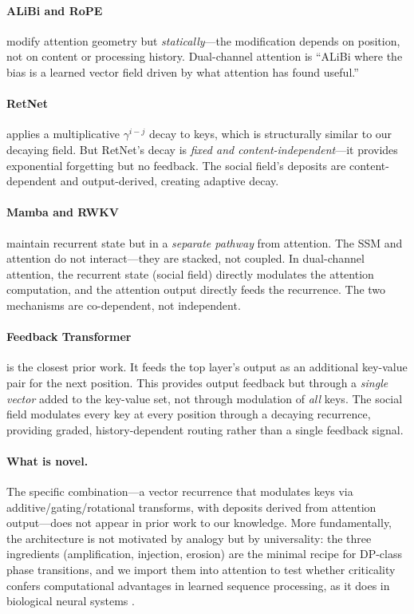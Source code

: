 \documentclass[11pt,a4paper]{article}
\begin{document}
\paragraph{ALiBi and RoPE} modify attention geometry but
\emph{statically}---the modification depends on position, not on
content or processing history.  Dual-channel attention is ``ALiBi
where the bias is a learned vector field driven by what attention
has found useful.''

\paragraph{RetNet} applies a multiplicative $\gamma^{i-j}$ decay to
keys, which is structurally similar to our decaying field.  But
RetNet's decay is \emph{fixed and content-independent}---it provides
exponential forgetting but no feedback.  The social field's deposits
are content-dependent and output-derived, creating adaptive decay.

\paragraph{Mamba and RWKV} maintain recurrent state but in a
\emph{separate pathway} from attention.  The SSM and attention do not
interact---they are stacked, not coupled.  In dual-channel attention,
the recurrent state (social field) directly modulates the attention
computation, and the attention output directly feeds the recurrence.
The two mechanisms are co-dependent, not independent.

\paragraph{Feedback Transformer \cite{fan2021feedback}} is the
closest prior work.  It feeds the top layer's output as an
additional key-value pair for the next position.  This provides
output feedback but through a \emph{single vector} added to the
key-value set, not through modulation of \emph{all} keys.  The
social field modulates every key at every position through a
decaying recurrence, providing graded, history-dependent routing
rather than a single feedback signal.

\paragraph{What is novel.}
The specific combination---a vector recurrence that modulates keys
via additive/gating/rotational transforms, with deposits derived
from attention output---does not appear in prior work to our
knowledge.  More fundamentally, the architecture is not motivated by
analogy but by universality: the three ingredients
(amplification, injection, erosion) are the minimal recipe for DP-class
phase transitions, and we import them into attention to test whether
criticality confers computational advantages in learned sequence
processing, as it does in biological neural systems
\cite{beggs2003,shew2013}.
\end{document}

